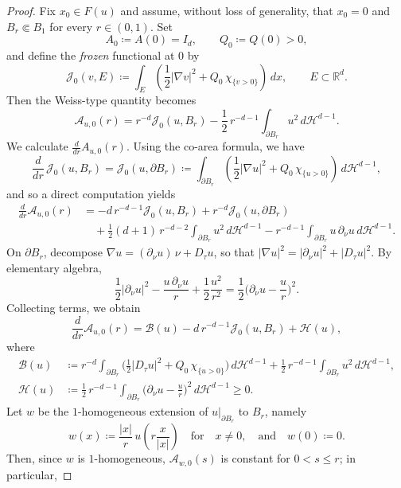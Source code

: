 \documentclass[reqno,11pt]{amsart}
\newcommand{\1}{\mathds{1}}  %
\numberwithin{equation}{section}
\begin{document}
\begin{proof}
Fix $x_0\in F(u)$ and assume, without loss of generality, that $x_0=0$ and $B_r\Subset B_1$ for every $r\in(0,1)$.
Set
\[
    A_0 \coloneqq A(0) = I_d, \qquad Q_0\coloneqq Q(0)>0,
\]
and define the \emph{frozen} functional at $0$ by
\[
    \mathcal J_{0}(v,E)\coloneqq \int_{E}\left(\frac12|\nabla v|^2+Q_0\,\chi_{\{v>0\}}\right)\,dx, \qquad E\subset \mathbb R^d.
\]
Then the Weiss-type quantity becomes
\[
    \mathcal A_{u,0}(r)=r^{-d}\mathcal J_0(u,B_r)-\frac12\,r^{-d-1}\int_{\partial B_r}u^2\,d\mathcal H^{d-1}.
\]
We calculate $\frac{d}{dr} A_{u,0}(r)$. Using the co-area formula, we have
\[
    \frac{d}{dr}\,\mathcal J_0(u,B_r)=\mathcal J_0(u,\partial B_r)
    \coloneqq \int_{\partial B_r}\left(\frac12|\nabla u|^2+Q_0\,\chi_{\{u>0\}}\right)\,d\mathcal H^{d-1},
\]
and so a direct computation yields
\begin{align*}
    \frac{d}{dr}\mathcal A_{u,0}(r)
    &= -d\,r^{-d-1}\mathcal J_0(u,B_r)+r^{-d}\mathcal J_0(u,\partial B_r) \\
    &\quad +\frac12(d+1)\,r^{-d-2}\int_{\partial B_r}u^2\,d\mathcal H^{d-1}
    - r^{-d-1}\int_{\partial B_r}u\,\partial_\nu u\,d\mathcal H^{d-1}.
\end{align*}
On $\partial B_r$, decompose $\nabla u = (\partial_\nu u)\,\nu + D_\tau u$, so that $|\nabla u|^2=|\partial_\nu u|^2+|D_\tau u|^2$.
By elementary algebra,
\[
    \frac12|\partial_\nu u|^2-\frac{u\,\partial_\nu u}{r}+\frac12\frac{u^2}{r^2}
    =\frac12\Big(\partial_\nu u-\frac{u}{r}\Big)^2.
\]
Collecting terms, we obtain
\begin{equation}\label{eq:Weiss-derivative}
    \frac{d}{dr}\mathcal A_{u,0}(r) = \mathcal B(u)-d\,r^{-d-1}\mathcal J_0(u,B_r)+\mathcal H(u),
\end{equation}
where
\begin{align*}
\mathcal B(u)
&\coloneqq r^{-d}\int_{\partial B_r}\Big(\tfrac12|D_\tau u|^2+Q_0\,\chi_{\{u>0\}}\Big)\,d\mathcal H^{d-1}
+\frac12\,r^{-d-1}\int_{\partial B_r}u^2\,d\mathcal H^{d-1},\\
\mathcal H(u)
&\coloneqq \frac12\,r^{-d-1}\int_{\partial B_r}\Big(\partial_\nu u-\frac{u}{r}\Big)^2\,d\mathcal H^{d-1}\ge 0.
\end{align*}
Let $w$ be the $1$-homogeneous extension of $u|_{\partial B_r}$ to $B_r$, namely
\[
    w(x)\coloneqq \frac{|x|}{r}\,u\!\left(r\frac{x}{|x|}\right)\quad \text{for} \quad x \not = 0, \quad \text{and}\quad w(0)\coloneqq 0.
\]
Then, since $w$ is $1$-homogeneous, $\mathcal A_{w,0}(s)$ is constant for $0<s\le r$; in particular,

\end{proof}
\end{document}
